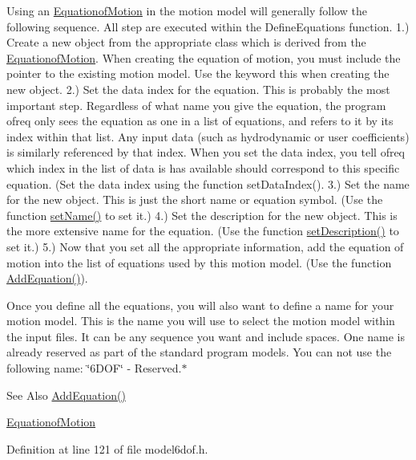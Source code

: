 Using an \hyperlink{classosea_1_1ofreq_1_1_equationof_motion}{Equationof\-Motion} in the motion model will generally follow the following sequence. All step are executed within the Define\-Equations function. 1.) Create a new object from the appropriate class which is derived from the \hyperlink{classosea_1_1ofreq_1_1_equationof_motion}{Equationof\-Motion}. When creating the equation of motion, you must include the pointer to the existing motion model. Use the keyword this when creating the new object. 2.) Set the data index for the equation. This is probably the most important step. Regardless of what name you give the equation, the program ofreq only sees the equation as one in a list of equations, and refers to it by its index within that list. Any input data (such as hydrodynamic or user coefficients) is similarly referenced by that index. When you set the data index, you tell ofreq which index in the list of data is has available should correspond to this specific equation. (Set the data index using the function set\-Data\-Index(). 3.) Set the name for the new object. This is just the short name or equation symbol. (Use the function \hyperlink{classosea_1_1ofreq_1_1_motion_model_a42d989727028c18c59ba04f958bc7b74}{set\-Name()} to set it.) 4.) Set the description for the new object. This is the more extensive name for the equation. (Use the function \hyperlink{classosea_1_1ofreq_1_1_motion_model_a5097540bb98ad753594d41890e6ef30d}{set\-Description()} to set it.) 5.) Now that you set all the appropriate information, add the equation of motion into the list of equations used by this motion model. (Use the function \hyperlink{classosea_1_1ofreq_1_1_motion_model_a73489d88c07b26109bbb9bdd0a576b30}{Add\-Equation()}).

Once you define all the equations, you will also want to define a name for your motion model. This is the name you will use to select the motion model within the input files. It can be any sequence you want and include spaces. One name is already reserved as part of the standard program models. You can not use the following name\-: \char`\"{}6\-D\-O\-F\char`\"{} -\/ Reserved.$\ast$

\begin{DoxySeeAlso}{See Also}
\hyperlink{classosea_1_1ofreq_1_1_motion_model_a73489d88c07b26109bbb9bdd0a576b30}{Add\-Equation()} 

\hyperlink{classosea_1_1ofreq_1_1_equationof_motion}{Equationof\-Motion} 
\end{DoxySeeAlso}


Definition at line 121 of file model6dof.\-h.



